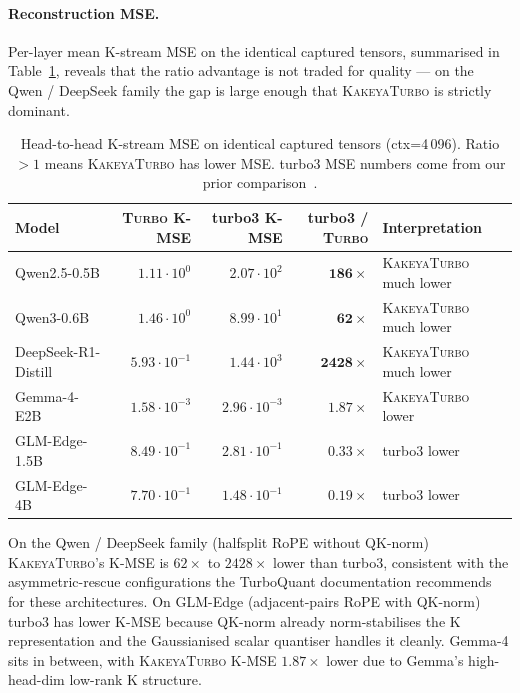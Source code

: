 \documentclass[11pt,a4paper]{article}
\theoremstyle{definition}
\theoremstyle{plain}
\begin{document}
\paragraph{Reconstruction MSE.}
Per-layer mean K-stream MSE on the identical captured tensors, summarised in Table~\ref{tab:mse-vs-turbo3}, reveals that the ratio advantage is not traded for quality --- on the Qwen / DeepSeek family the gap is large enough that \textsc{KakeyaTurbo} is strictly dominant.

\begin{table}[H]
\centering
\small
\caption{Head-to-head K-stream MSE on identical captured tensors (ctx=4\,096). Ratio $>1$ means \textsc{KakeyaTurbo} has lower MSE. turbo3 MSE numbers come from our prior comparison~\cite{kakeya-kv}.}
\label{tab:mse-vs-turbo3}
\begin{tabular}{lrrrl}
  \toprule
  Model & \textsc{Turbo} K-MSE & turbo3 K-MSE & turbo3 / \textsc{Turbo} & Interpretation \\
  \midrule
  Qwen2.5-0.5B                  & $1.11\!\cdot\!10^{0}$  & $2.07\!\cdot\!10^{2}$  & $\mathbf{186\times}$   & \textsc{KakeyaTurbo} much lower \\
  Qwen3-0.6B                    & $1.46\!\cdot\!10^{0}$  & $8.99\!\cdot\!10^{1}$  & $\mathbf{62\times}$    & \textsc{KakeyaTurbo} much lower \\
  DeepSeek-R1-Distill           & $5.93\!\cdot\!10^{-1}$ & $1.44\!\cdot\!10^{3}$  & $\mathbf{2428\times}$  & \textsc{KakeyaTurbo} much lower \\
  Gemma-4-E2B                   & $1.58\!\cdot\!10^{-3}$ & $2.96\!\cdot\!10^{-3}$ & $1.87\times$           & \textsc{KakeyaTurbo} lower \\
  GLM-Edge-1.5B                 & $8.49\!\cdot\!10^{-1}$ & $2.81\!\cdot\!10^{-1}$ & $0.33\times$           & turbo3 lower \\
  GLM-Edge-4B                   & $7.70\!\cdot\!10^{-1}$ & $1.48\!\cdot\!10^{-1}$ & $0.19\times$           & turbo3 lower \\
  \bottomrule
\end{tabular}
\end{table}

On the Qwen / DeepSeek family (halfsplit RoPE without QK-norm) \textsc{KakeyaTurbo}'s K-MSE is $62\times$ to $2428\times$ lower than turbo3, consistent with the asymmetric-rescue configurations the TurboQuant documentation recommends for these architectures. On GLM-Edge (adjacent-pairs RoPE with QK-norm) turbo3 has lower K-MSE because QK-norm already norm-stabilises the K representation and the Gaussianised scalar quantiser handles it cleanly. Gemma-4 sits in between, with \textsc{KakeyaTurbo} K-MSE $1.87\times$ lower due to Gemma's high-head-dim low-rank K structure.
\end{document}
